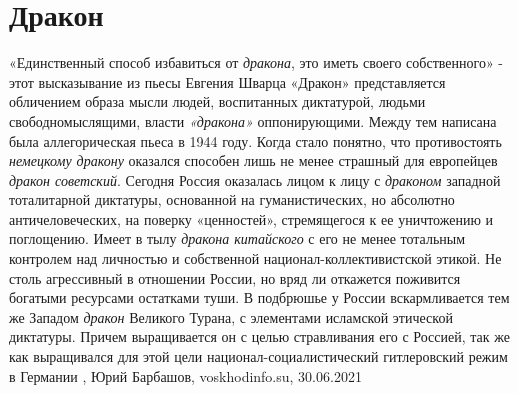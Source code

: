  
 
 
 
 
\chapter{Дракон}
\label{sec:slova.drakon}

«Единственный способ избавиться от \emph{дракона}, это иметь своего собственного» -
этот высказывание из пьесы Евгения Шварца «Дракон» представляется обличением
образа мысли людей, воспитанных диктатурой, людьми свободномыслящими, власти
\emph{«дракона»} оппонирующими. Между тем написана была аллегорическая пьеса в 1944
году. Когда стало понятно, что противостоять \emph{немецкому дракону} оказался
способен лишь не менее страшный для европейцев \emph{дракон советский}.  Сегодня
Россия оказалась лицом к лицу с \emph{драконом} западной тоталитарной диктатуры,
основанной на гуманистических, но абсолютно античеловеческих, на поверку
«ценностей», стремящегося к ее уничтожению и поглощению. Имеет в тылу \emph{дракона
китайского} с его не менее тотальным контролем над личностью и собственной
национал-коллективистской этикой. Не столь агрессивный в отношении России, но
вряд ли откажется поживится богатыми ресурсами остатками туши. В подбрюшье у
России вскармливается тем же Западом \emph{дракон} Великого Турана, с элементами
исламской этической диктатуры. Причем выращивается он с целью стравливания его
с Россией, так же как выращивался для этой цели национал-социалистический
гитлеровский режим в Германии
, 
Юрий Барбашов, voskhodinfo.su, 30.06.2021

